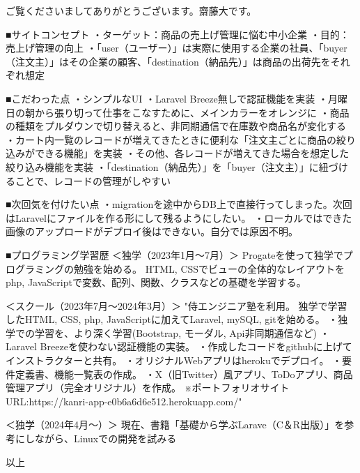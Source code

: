 ご覧くださいましてありがとうございます。齋藤大です。


■サイトコンセプト
・ターゲット：商品の売上げ管理に悩む中小企業
・目的：売上げ管理の向上
・「user（ユーザー）」は実際に使用する企業の社員、「buyer（注文主）」はその企業の顧客、「destination（納品先）」は商品の出荷先をそれぞれ想定

■こだわった点
・シンプルなUI
・Laravel Breeze無しで認証機能を実装
・月曜日の朝から張り切って仕事をこなすために、メインカラーをオレンジに
・商品の種類をプルダウンで切り替えると、非同期通信で在庫数や商品名が変化する
・カート内一覧のレコードが増えてきたときに便利な「注文主ごとに商品の絞り込みができる機能」を実装
・その他、各レコードが増えてきた場合を想定した絞り込み機能を実装
・「destination（納品先）」を「buyer（注文主）」に紐づけることで、レコードの管理がしやすい

■次回気を付けたい点
・migrationを途中からDB上で直接行ってしまった。次回はLaravelにファイルを作る形にして残るようにしたい。
・ローカルではできた画像のアップロードがデプロイ後はできない。自分では原因不明。


■プログラミング学習歴	
＜独学（2023年1月～7月）＞	
Progateを使って独学でプログラミングの勉強を始める。
HTML, CSSでビューの全体的なレイアウトを php, JavaScriptで変数、配列、関数、クラスなどの基礎を学習する。
		
＜スクール（2023年7月～2024年3月）＞		
"侍エンジニア塾を利用。
独学で学習したHTML, CSS, php, JavaScriptに加えてLaravel, mySQL, gitを始める。
・独学での学習を、より深く学習(Bootstrap, モーダル, Api非同期通信など)
・Laravel Breezeを使わない認証機能の実装。
・作成したコードをgithubに上げてインストラクターと共有。
・オリジナルWebアプリはherokuでデプロイ。
・要件定義書、機能一覧表の作成。
・X（旧Twitter）風アプリ、ToDoアプリ、商品管理アプリ（完全オリジナル）を作成。
※ポートフォリオサイトURL:https://kanri-app-e0b6a6d6e512.herokuapp.com/"		

＜独学（2024年4月～）＞		
現在、書籍「基礎から学ぶLarave（C＆R出版）」を参考にしながら、Linuxでの開発を試みる

以上